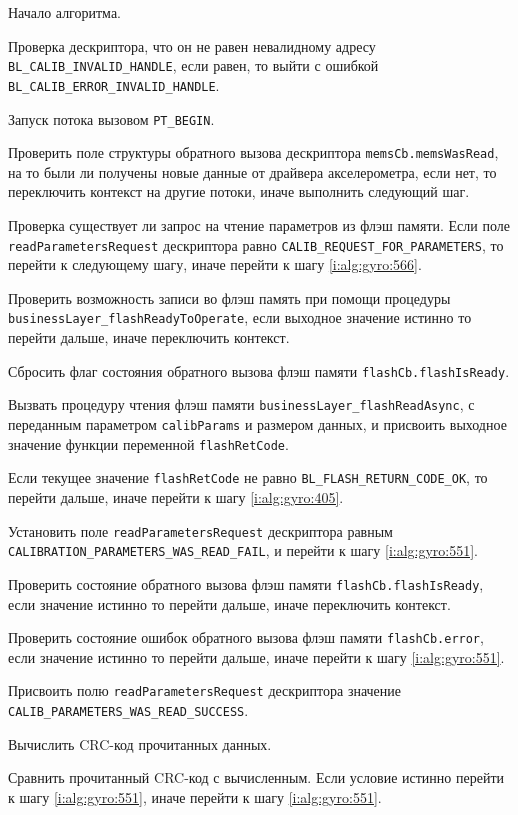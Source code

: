 \begin{enumerate_step}
    \item Начало алгоритма.
    \item Проверка дескриптора, что он не равен невалидному адресу \lstinline|BL_CALIB_INVALID_HANDLE|, если равен, то выйти с ошибкой
    \lstinline|BL_CALIB_ERROR_INVALID_HANDLE|.
    \item Запуск потока вызовом \lstinline|PT_BEGIN|.
    \item \label{i:alg:gyro:551} Проверить поле структуры обратного вызова дескриптора \lstinline|memsCb.memsWasRead|, на то были ли получены новые данные от драйвера акселерометра, 
    если нет, то переключить контекст на другие потоки, иначе выполнить следующий шаг.
    \item \label{i:alg:gyro:557} Проверка существует ли запрос на чтение параметров из флэш памяти. Если поле \lstinline|readParametersRequest| дескриптора равно \lstinline|CALIB_REQUEST_FOR_PARAMETERS|,
    то перейти к следующему шагу, иначе перейти к шагу \ref{i:alg:gyro:566}.
    \item Проверить возможность записи во флэш память при помощи процедуры \lstinline|businessLayer_flashReadyToOperate|, если выходное значение истинно то перейти дальше, иначе переключить контекст.
    \item Сбросить флаг состояния обратного вызова флэш памяти \lstinline|flashCb.flashIsReady|.
    \item Вызвать процедуру чтения флэш памяти \lstinline|businessLayer_flashReadAsync|, с переданным параметром \lstinline|calibParams| и размером данных, и присвоить выходное значение функции переменной \lstinline|flashRetCode|.
    \item Если текущее значение \lstinline|flashRetCode| не равно \lstinline|BL_FLASH_RETURN_CODE_OK|, то перейти дальше, иначе перейти к шагу
    \ref{i:alg:gyro:405}.
    \item Установить поле \lstinline|readParametersRequest| дескриптора равным \lstinline|CALIBRATION_PARAMETERS_WAS_READ_FAIL|, и перейти к шагу \ref{i:alg:gyro:551}.
    \item \label{i:alg:gyro:405}  Проверить состояние обратного вызова флэш памяти \lstinline|flashCb.flashIsReady|, если значение истинно то перейти дальше, иначе переключить контекст.
    \item Проверить состояние ошибок обратного вызова флэш памяти \lstinline|flashCb.error|, если значение истинно то перейти дальше, иначе перейти к шагу \ref{i:alg:gyro:551}.
    \item Присвоить полю \lstinline|readParametersRequest| дескриптора значение \lstinline|CALIB_PARAMETERS_WAS_READ_SUCCESS|.
    \item Вычислить CRC-код прочитанных данных.
    \item Сравнить прочитанный CRC-код с вычисленным. Если условие истинно перейти к шагу \ref{i:alg:gyro:551}, иначе перейти к шагу \ref{i:alg:gyro:551}.
    

\end{enumerate_step}
